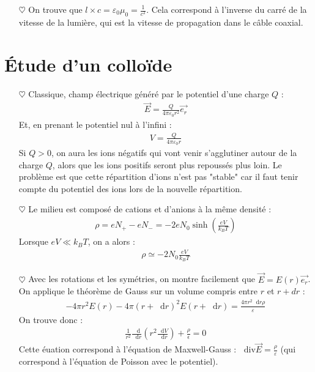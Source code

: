 \documentclass{report}
\newcommand*\dif{\mathop{}\!\mathrm{d}}
\newcommand*\diver{\mathop{}\!\mathrm{div}}
\begin{document}
\begin{itemize}
	\item[$\heartsuit$] On trouve que $l\times c=\varepsilon_0\mu_0=\frac{1}{c^2}$. Cela correspond à l'inverse du carré de la vitesse de la lumière, qui est la vitesse de propagation dans le câble coaxial.
	
\end{itemize}

\section*{Étude d'un colloïde}

\begin{itemize}

	\item[$\heartsuit$] Classique, champ électrique généré par le potentiel d'une charge $Q$ :
	\begin{align*}
		\vec{E}=\frac{Q}{4\pi\varepsilon_0 r^2}\vec{e_r}
	\end{align*}
 Et, en prenant le potentiel nul à l'infini :
	\begin{align*}
		V=\frac{Q}{4\pi\varepsilon_0 r}
	\end{align*}
Si $Q>0$, on aura les ions négatifs qui vont venir s'agglutiner autour de la charge $Q$, alors que les ions positifs seront plus repoussés plus loin. Le problème est que cette répartition d'ions n'est pas "stable" car il faut tenir compte du potentiel des ions lors de la nouvelle répartition. 	
	
	\item[$\heartsuit$] Le milieu est composé de cations et d'anions à la même densité :
	\begin{align*}
		\rho=eN_+-eN_-=-2eN_0\sinh\left( \frac{eV}{k_BT}\right) 
	\end{align*}
Lorsque $eV\ll k_BT$, on a alors : 
\begin{align*}
	\rho\simeq -2N_0\frac{eV}{k_BT}
\end{align*}

	\item[$\heartsuit$] Avec les rotations et les symétries, on montre facilement que $\vec{E}=E(r)\vec{e_r}$. On applique le théorème de Gauss sur un volume compris entre $r$ et $r+dr$ :
	\begin{align*}
		-4\pi r^2E(r)-4\pi(r+\dif r)^2E(r+\dif r)=\frac{4\pi r^2\dif r\rho}{\varepsilon}
	\end{align*}
	On trouve donc :
	\begin{align*}
		\frac{1}{r^2}\frac{\dif}{\dif r}\left( r^2\frac{\dif V}{\dif r}\right) +\frac{\rho}{\epsilon}=0
	\end{align*}
	Cette éuation correspond à l'équation de Maxwell-Gauss : $\diver\vec{E}=\frac{\rho}{\varepsilon}$ (qui correspond à l'équation de Poisson avec le potentiel).


\end{itemize}
\end{document}

